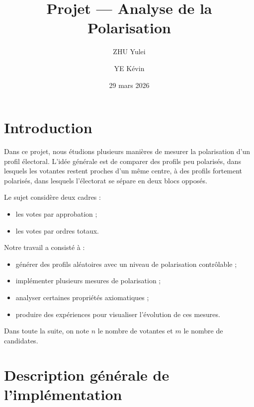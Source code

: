 \documentclass[11pt,a4paper]{article}
\title{Projet --- Analyse de la Polarisation}
\author{ZHU Yulei \and YE K\'evin}
\date{29 mars 2026}
\begin{document}
\maketitle

\tableofcontents
\newpage

\section{Introduction}

Dans ce projet, nous \'etudions plusieurs mani\`eres de mesurer la polarisation d'un profil \'electoral. L'id\'ee g\'en\'erale est de comparer des profils peu polaris\'es, dans lesquels les votantes restent proches d'un m\^eme centre, \`a des profils fortement polaris\'es, dans lesquels l'\'electorat se s\'epare en deux blocs oppos\'es.

Le sujet consid\`ere deux cadres :
\begin{itemize}[leftmargin=*]
    \item les votes par approbation ;
    \item les votes par ordres totaux.
\end{itemize}

Notre travail a consist\'e \`a :
\begin{itemize}[leftmargin=*]
    \item g\'en\'erer des profils al\'eatoires avec un niveau de polarisation contr\^olable ;
    \item impl\'ementer plusieurs mesures de polarisation ;
    \item analyser certaines propri\'et\'es axiomatiques ;
    \item produire des exp\'eriences pour visualiser l'\'evolution de ces mesures.
\end{itemize}

Dans toute la suite, on note \(n\) le nombre de votantes et \(m\) le nombre de candidates.

\section{Description g\'en\'erale de l'impl\'ementation}
\end{document}

